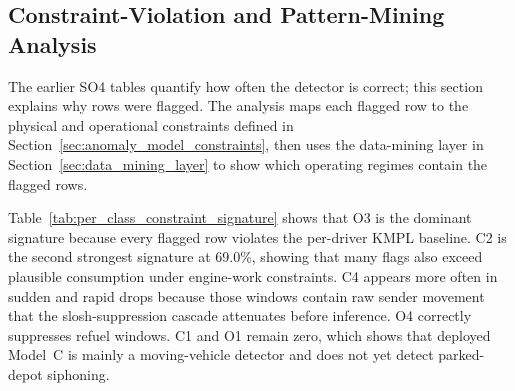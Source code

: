 \subsection{Constraint-Violation and Pattern-Mining Analysis}
\label{sec:constraint_violation_pattern_mining}

The earlier SO4 tables quantify how often the detector is correct; this section explains why rows were flagged. The analysis maps each flagged row to the physical and operational constraints defined in Section~\ref{sec:anomaly_model_constraints}, then uses the data-mining layer in Section~\ref{sec:data_mining_layer} to show which operating regimes contain the flagged rows.

\begin{table}[!htbp]
\centering
\caption{Per-Class Constraint-Violation Signature}
\label{tab:per_class_constraint_signature}
\tiny
\setlength{\tabcolsep}{2pt}
\renewcommand{\arraystretch}{1.15}
\normalsize
\end{table}

Table~\ref{tab:per_class_constraint_signature} shows that O3 is the dominant signature because every flagged row violates the per-driver KMPL baseline. C2 is the second strongest signature at 69.0\%, showing that many flags also exceed plausible consumption under engine-work constraints. C4 appears more often in sudden and rapid drops because those windows contain raw sender movement that the slosh-suppression cascade attenuates before inference. O4 correctly suppresses refuel windows. C1 and O1 remain zero, which shows that deployed Model~C is mainly a moving-vehicle detector and does not yet detect parked-depot siphoning.

